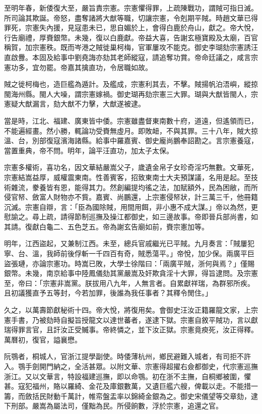 \begin{pinyinscope}
至明年春，新倭復大至，嚴旨責宗憲。宗憲懼得罪，上疏陳戰功，謂賊可指日滅。所司論其欺誕。帝怒，盡奪諸將大猷等職，切讓宗憲，令剋期平賊。時趙文華已得罪死，宗憲失內援，見寇患未已，思自媚於上，會得白鹿於舟山，獻之。帝大悅，行告廟禮，厚賚銀幣。未幾，復以白鹿獻。帝益大喜，告謝玄極寶殿及太廟，百官稱賀，加宗憲秩。既而岑港之賊徙巢柯梅，官軍屢攻不能克。御史李瑚劾宗憲誘汪直啟釁。本固及給事中劉堯誨亦劾其老師縱寇，請追奪功賞。帝命廷議之，咸言宗憲功多，宜勿罷。帝嘉其擒直功，令居職如故。

賊之徙柯梅也，造巨艦為遁計。及艦成，宗憲利其去，不擊。賊揚帆泊浯嶼，縱掠閩海州縣。閩人大噪，謂宗憲嫁禍。御史瑚再劾宗憲三大罪。瑚與大猷皆閩人，宗憲疑大猷漏言，劾大猷不力擊，大猷遂被逮。

當是時，江北、福建、廣東皆中倭。宗憲雖盡督東南數十府，道遠，但遙領而已，不能遍經畫。然小勝，輒論功受賚無虛月。即敗衄，不與其罪。三十八年，賊大掠溫、台，別部復寇濱海諸縣。給事中羅嘉賓、御史龐尚鵬奉詔勘之。言宗憲養寇，當置重典，帝不問。明年，論平汪直功，加太子太保。

宗憲多權術，喜功名，因文華結嚴嵩父子，歲遺金帛子女珍奇淫巧無數。文華死，宗憲結嵩益厚，威權震東南。性善賓客，招致東南士大夫預謀議，名用是起。至技術雜流，豢養皆有恩，能得其力。然創編提均徭之法，加賦額外，民為困敝，而所侵官帑、斂富人財物亦不貲。嘉賓、尚鵬還，上宗憲侵帑狀，計三萬三千，他冊籍沉滅。宗憲自辯，言：「臣為國除賊，用間用餌，非小惠不成大謀。」帝以為然，更慰諭之。尋上疏，請得節制巡撫及操江都御史，如三邊故事。帝即晉兵部尚書，如其請。復獻白龜二、五色芝五。帝為謝玄告廟如前，賚宗憲加等。

明年，江西盜起，又兼制江西。未至，總兵官戚繼光已平賊。九月奏言：「賊屢犯寧、台、溫，我師前後俘斬一千四百有奇，賊悉蕩平。」帝悅，加少保。兩廣平巨盜張璉，亦論宗憲功。時嵩已敗，大學士徐階曰：「兩廣平賊，浙何與焉？」僅賜銀幣。未幾，南京給事中陸鳳儀劾其黨嚴嵩及奸欺貪淫十大罪，得旨逮問。及宗憲至，帝曰：「宗憲非嵩黨。朕拔用八九年，人無言者。自累獻祥瑞，為群邪所疾。且初議獲直予五等封，今若加罪，後誰為我任事者？其釋令閒住。」

久之，以萬壽節獻秘術十四。帝大悅，將復用矣。會御史汪汝正籍羅龍文家，上宗憲手書，乃被劾時自擬旨授龍文以達世蕃者，遂逮下獄。宗憲自敘平賊功，言以獻瑞得罪言官，且訐汝正受贓事。帝終憐之，並下汝正獄。宗憲竟瘐死，汝正得釋。萬曆初，復官，謚襄懋。

阮鶚者，桐城人，官浙江提學副使。時倭薄杭州，鄉民避難入城者，有司拒不許入。鶚手劍開門納之，全活甚眾。以附文華、宗憲得超擢右僉都御史，代宗憲巡撫浙江。又以文華言，特設福建巡撫，即以命鶚。初在浙不主撫，自桐鄉被圍，懼甚。寇犯福州，賂以羅綺、金花及庫銀數萬，又遺巨艦六艘，俾載以走。不能措一籌，而斂括民財動千萬計，帷帟盤盂率以錦綺金銀為之。御史宋儀望等交章劾，逮下刑部。嚴嵩為屬法司，僅黜為民。所侵餉數，浮於宗憲，追還之官。


\end{pinyinscope}
